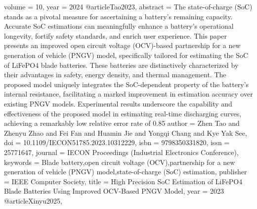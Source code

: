 {{{{{{{{{{{   volume = {10},
   year = {2024}
}
@article{Tao2023,
   abstract = {The state-of-charge (SoC) stands as a pivotal measure for ascertaining a battery's remaining capacity. Accurate SoC estimations can meaningfully enhance a battery's operational longevity, fortify safety standards, and enrich user experience. This paper presents an improved open circuit voltage (OCV)-based partnership for a new generation of vehicle (PNGV) model, specifically tailored for estimating the SoC of LiFePO4 blade batteries. These batteries are distinctively characterized by their advantages in safety, energy density, and thermal management. The proposed model uniquely integrates the SoC-dependent property of the battery's internal resistance, facilitating a marked improvement in estimation accuracy over existing PNGV models. Experimental results underscore the capability and effectiveness of the proposed model in estimating real-time discharging curves, achieving a remarkably low relative error rate of 0.85%
   author = {Zhen Tao and Zhenyu Zhao and Fei Fan and Huamin Jie and Yongqi Chang and Kye Yak See},
   doi = {10.1109/IECON51785.2023.10312229},
   isbn = {9798350331820},
   issn = {25771647},
   journal = {IECON Proceedings (Industrial Electronics Conference)},
   keywords = {Blade battery,open circuit voltage (OCV),partnership for a new generation of vehicle (PNGV) model,state-of-charge (SoC) estimation},
   publisher = {IEEE Computer Society},
   title = {High Precision SoC Estimation of LiFePO4 Blade Batteries Using Improved OCV-Based PNGV Model},
   year = {2023}
}
@article{Xinyu2025,
}}}}}}}}}}}}
